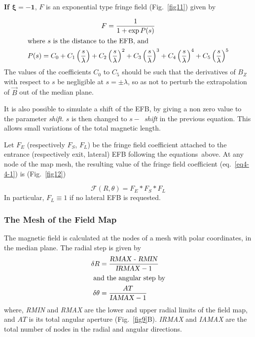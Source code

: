 \noindent\textbf{If $\mathbf{\xi  = -1}$},  $ F $ is an exponential type
fringe field (Fig.~\ref{fig11}) given by~\cite{Biblio12}  %

 \begin{gather}
	 F = \dfrac{1 }{ 1+ \exp  P(s)}
 	\label{eq4-4-4} \\
\intertext{where $ s $ is the distance to the EFB, and }
    P(s) = C_0
       +C_1 \left(  \dfrac{s }{ \lambda} \right) 
       +C_2 \left( \dfrac{s }{ \lambda} \right)^2 
       + C_3 \left( \dfrac{s }{ \lambda} \right)^3 
       +C_4 \left( \dfrac{s }{ \lambda} \right)^4 
       + C_5 \left(\dfrac{s }{ \lambda} \right)^5 \label{eq4-4-5}
\end{gather}
%
The values of the coefficients $ C_0 $ to $ C_5 $ should be such that the 
derivatives of $ B_Z$ with respect to $ s $ be negligible at $ s=\pm \lambda $, so as not
to perturb the extrapolation of $ \vec B $ out of the median plane.

\noindent It is also possible to simulate a shift of the EFB, by giving a non
zero value to the parameter \textsl{shift}.  $ s $ is then changed to $ s  -$~\textsl{shift} in the 
previous equation.   This allows small variations of the total 
magnetic length. 

\noindent Let $ F_E $ (respectively $ F_S$, $F_L$)   be the fringe field
coefficient attached to the entrance (respectively exit, lateral) EFB following  the equations\ above. At any
node of the map mesh, the resulting value of the fringe field coefficient (eq.~\ref{eq4-4-1}) is 
(Fig.~\ref{fig12})  

$$ \mathcal{F}(R,\theta)= F_E \ast  F_S \ast  F_L $$
%
 In particular, $F_L\equiv 1 $ if no lateral EFB is requested. 

\subsubsection*{The Mesh of the Field Map} 

The magnetic field is calculated at the nodes of a mesh with polar
coordinates, in the median plane.  The radial step is given by 
 \begin{align*}
	 \delta R & = \dfrac{\text{\textsl{RMAX - RMIN}} }{\text{\textsl{IRMAX}}-1} \\
\intertext{ and the angular step by} 
	\delta \theta  & = \dfrac{AT }{ \text{\textsl{IAMAX}}-1} 
 \end{align*}
%
\noindent where, \textsl{RMIN} and  \textsl{RMAX}   are the lower and upper
radial limits of the field map, and $ AT $ is its total angular aperture (Fig.~\ref{fig9}B).  
 \textsl{IRMAX} and  \textsl{IAMAX} are the total number of nodes in the radial and 
 angular directions. 
 

